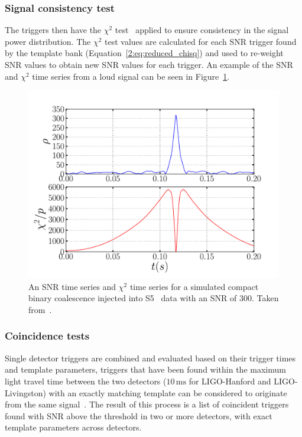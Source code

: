 \subsubsection{Signal consistency test}

The triggers then have the $\chi^{2}$ test~\cite{Allen_Chi:2005} applied to ensure consistency in the signal power distribution. The $\chi^{2}$ test values are calculated for each SNR trigger found by the template bank (Equation~\ref{2:eq:reduced_chisq}) and used to re-weight SNR values to obtain new SNR values for each trigger. An example of the SNR and $\chi^{2}$ time series from a loud signal can be seen in Figure~\ref{2:fig:snr-timeseries}.
%
\begin{figure}
    \centering
    \includegraphics[width=0.75\linewidth]{images/2_searches/ihope_snr_timeseries.pdf}
    \caption{An SNR time series and $\chi^{2}$ time series for a simulated compact binary coalescence injected into S5~\cite{S5:2012} data with an SNR of $300$. Taken from~\cite{IHOPE:2012zx}.}
    \label{2:fig:snr-timeseries}
\end{figure}
%

\subsubsection{Coincidence tests}

Single detector triggers are combined and evaluated based on their trigger times and template parameters, triggers that have been found within the maximum light travel time between the two detectors ($10 \, \text{ms}$ for LIGO-Hanford and LIGO-Livingston) with an exactly matching template can be considered to originate from the same \gwadj signal~\cite{Robinson:2008}. The result of this process is a list of coincident triggers found with SNR above the threshold in two or more detectors, with exact template parameters across detectors.

